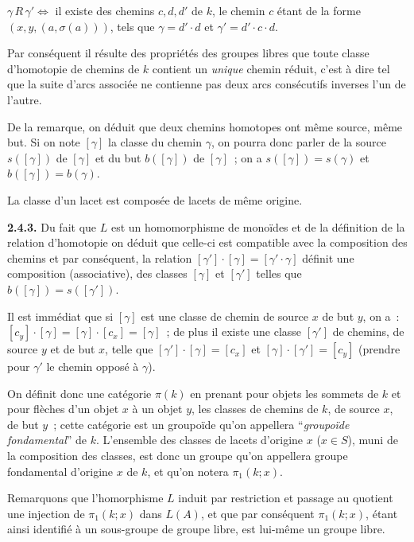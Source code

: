 $\gamma \, R \, \gamma' \Leftrightarrow$ il existe des chemins $c, d, d'$ de $k$, le chemin $c$ étant de
la forme $(x, y, (a, \sigma(a)))$, tels que $\gamma = d' \cdot d$ et $\gamma' = d' \cdot c \cdot d$.

Par conséquent il résulte des propriétés des groupes libres que toute classe d'homotopie de chemins de $k$ contient un \emph{unique} chemin réduit, c'est à dire tel que la suite d'arcs associée ne contienne pas deux arcs consécutifs inverses l'un de l'autre.

De la remarque, on déduit que deux chemins homotopes ont même source, même but. Si on note $[\gamma]$ la classe du chemin $\gamma$, on pourra donc parler de la source $s([\gamma])$ de $[\gamma]$ et du but $b([\gamma])$ de $[\gamma]$~; on a $s([\gamma]) = s(\gamma)$ et $b([\gamma]) = b(\gamma)$.

La classe d'un lacet est composée de lacets de même origine.

{\bf 2.4.3.} Du fait que $L$ est un homomorphisme de monoïdes et de la définition de la relation d'homotopie on déduit que celle-ci est compatible avec la composition des chemins et par conséquent, la relation $[\gamma'] \cdot [\gamma] = [\gamma' \cdot \gamma]$ définit une composition (associative), des classes $[\gamma]$ et $[\gamma']$ telles que $b([\gamma]) = s([\gamma'])$.

Il est immédiat que si $[\gamma]$ est une classe de chemin de source $x$ de but $y$, on a~: $[c_y] \cdot [\gamma] = [\gamma] \cdot [c_x] = [\gamma]$~; de plus il existe une classe $[\gamma']$ de chemins, de source $y$ et de but $x$, telle que $[\gamma'] \cdot [\gamma] = [c_x]$ et $[\gamma] \cdot [\gamma'] = [c_y]$ (prendre pour $\gamma'$ le chemin opposé à $\gamma$).

On définit donc une catégorie $\pi(k)$ en prenant pour objets les sommets de $k$ et pour flèches d'un objet $x$ à un objet $y$, les classes de chemins de $k$, de source $x$, de but $y$~; cette catégorie est un groupoïde qu'on appellera ``\emph{groupoïde fondamental}'' de $k$. L'ensemble des classes de lacets d'origine $x$ ($x \in S$), muni de la composition des classes, est donc un groupe qu'on appellera groupe fondamental d'origine $x$ de $k$, et qu'on notera $\pi_1(k ; x)$.

Remarquons que l'homorphisme $L$ induit par restriction et passage au quotient une injection de $\pi_1(k ; x)$ dans $L(A)$, et que par conséquent $\pi_1(k ; x)$, étant ainsi identifié à un sous-groupe de groupe libre, est lui-même un groupe libre.


